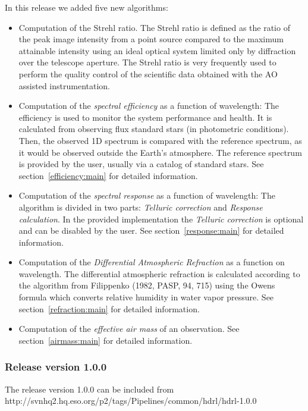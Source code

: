 In this release we added five new algorithms:
\begin{itemize}
\item Computation of the Strehl ratio. The Strehl ratio is defined as
  the ratio of the peak image intensity from a point source compared
  to the maximum attainable intensity using an ideal optical system
  limited only by diffraction over the telescope aperture. The Strehl
  ratio is very frequently used to perform the quality control of the
  scientific data obtained with the AO assisted instrumentation.
\item Computation of the \textit{spectral efficiency} as a function of
  wavelength: The efficiency is used to monitor the system performance
  and health. It is calculated from observing flux standard stars (in
  photometric conditions). Then, the observed 1D spectrum is compared
  with the reference spectrum, as it would be observed outside the
  Earth's atmosphere. The reference spectrum is provided by the user,
  usually via a catalog of standard stars. See
  section~\ref{efficiency:main} for detailed information.
\item Computation of the \textit{spectral response} as a function of
  wavelength: The algorithm is divided in two parts: \textit{Telluric
    correction} and \textit{Response calculation}. In the provided
  implementation the \textit{Telluric correction} is optional and can
  be disabled by the user. See section~\ref{response:main} for
  detailed information.
\item Computation of the \textit{Differential Atmospheric Refraction}
  as a function on wavelength. The differential atmospheric refraction
  is calculated according to the algorithm from Filippenko (1982,
  PASP, 94, 715) using the Owens formula which converts relative
  humidity in water vapor pressure. See section~\ref{refraction:main}
  for detailed information.
\item Computation of the \textit{effective air mass} of an
  observation.  See section~\ref{airmass:main} for detailed
  information.
\end{itemize}

 

\subsubsection{Release version 1.0.0}
The \HDRL release version 1.0.0 can be included from\\

http://svnhq2.hq.eso.org/p2/tags/Pipelines/common/hdrl/hdrl-1.0.0


